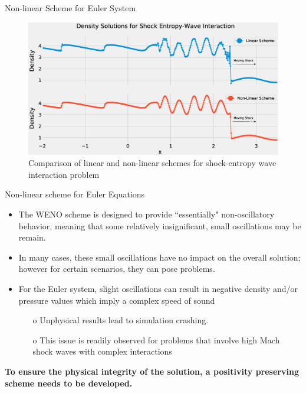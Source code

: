 \documentclass[9pt]{beamer}
\begin{document}
\begin{frame}{Non-linear Scheme for Euler System}
  \begin{figure}[H]
    \centering
    \includegraphics[scale=0.25]{DensitySolutions.eps}\caption{Comparison of linear and non-linear schemes for shock-entropy wave interaction problem}
      \label{fig:ShockEntropy}
    \end{figure}
\end{frame}

\begin{frame}{Non-linear scheme for Euler Equations}
  \begin{itemize}
    \item The WENO scheme is designed to provide ``essentially" non-oscillatory behavior, meaning that some relatively insignificant, small oscillations may be remain.
    \item In many cases, these small oscillations have no impact on the overall solution; however for certain scenarios, they can pose problems.
    \item For the Euler system, slight oscillations can result in negative density and/or pressure values which imply a complex speed of sound
    \begin{itemize}
      \item[o] Unphysical results lead to simulation crashing.
      \item[o] This issue is readily observed for problems that involve high Mach shock waves with complex interactions
    \end{itemize}  
  \end{itemize}
  \textbf{To ensure the physical integrity of the solution, a positivity preserving scheme needs to be developed.}
\end{frame}
\end{document}
